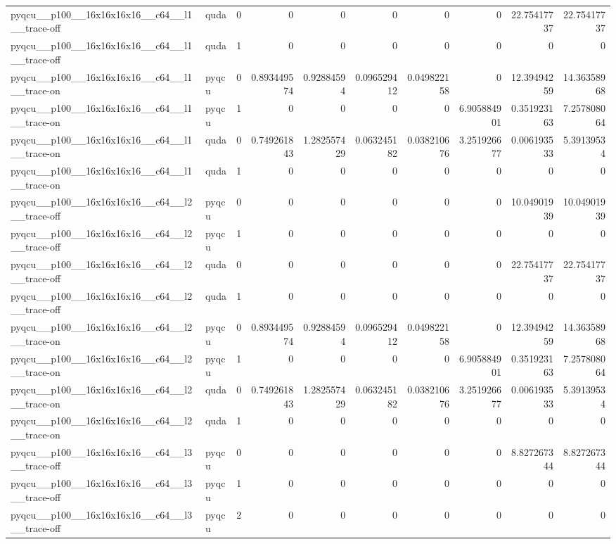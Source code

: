 \begin{table}[htbp]
\begin{tabular}{@{}llrrrrrrrr@{}}
pyqcu\_\_p100\_\_16x16x16x16\_\_c64\_\_l1\_\_trace-off & quda & 0 & 0 & 0 & 0 & 0 & 0 & 22.75417737 & 22.75417737 \\
pyqcu\_\_p100\_\_16x16x16x16\_\_c64\_\_l1\_\_trace-off & quda & 1 & 0 & 0 & 0 & 0 & 0 & 0 & 0 \\
pyqcu\_\_p100\_\_16x16x16x16\_\_c64\_\_l1\_\_trace-on & pyqcu & 0 & 0.893449574 & 0.92884594 & 0.096529412 & 0.049822158 & 0 & 12.39494259 & 14.36358968 \\
pyqcu\_\_p100\_\_16x16x16x16\_\_c64\_\_l1\_\_trace-on & pyqcu & 1 & 0 & 0 & 0 & 0 & 6.905884901 & 0.351923163 & 7.257808064 \\
pyqcu\_\_p100\_\_16x16x16x16\_\_c64\_\_l1\_\_trace-on & quda & 0 & 0.749261843 & 1.282557429 & 0.063245182 & 0.038210676 & 3.251926677 & 0.006193533 & 5.39139534 \\
pyqcu\_\_p100\_\_16x16x16x16\_\_c64\_\_l1\_\_trace-on & quda & 1 & 0 & 0 & 0 & 0 & 0 & 0 & 0 \\
pyqcu\_\_p100\_\_16x16x16x16\_\_c64\_\_l2\_\_trace-off & pyqcu & 0 & 0 & 0 & 0 & 0 & 0 & 10.04901939 & 10.04901939 \\
pyqcu\_\_p100\_\_16x16x16x16\_\_c64\_\_l2\_\_trace-off & pyqcu & 1 & 0 & 0 & 0 & 0 & 0 & 0 & 0 \\
pyqcu\_\_p100\_\_16x16x16x16\_\_c64\_\_l2\_\_trace-off & quda & 0 & 0 & 0 & 0 & 0 & 0 & 22.75417737 & 22.75417737 \\
pyqcu\_\_p100\_\_16x16x16x16\_\_c64\_\_l2\_\_trace-off & quda & 1 & 0 & 0 & 0 & 0 & 0 & 0 & 0 \\
pyqcu\_\_p100\_\_16x16x16x16\_\_c64\_\_l2\_\_trace-on & pyqcu & 0 & 0.893449574 & 0.92884594 & 0.096529412 & 0.049822158 & 0 & 12.39494259 & 14.36358968 \\
pyqcu\_\_p100\_\_16x16x16x16\_\_c64\_\_l2\_\_trace-on & pyqcu & 1 & 0 & 0 & 0 & 0 & 6.905884901 & 0.351923163 & 7.257808064 \\
pyqcu\_\_p100\_\_16x16x16x16\_\_c64\_\_l2\_\_trace-on & quda & 0 & 0.749261843 & 1.282557429 & 0.063245182 & 0.038210676 & 3.251926677 & 0.006193533 & 5.39139534 \\
pyqcu\_\_p100\_\_16x16x16x16\_\_c64\_\_l2\_\_trace-on & quda & 1 & 0 & 0 & 0 & 0 & 0 & 0 & 0 \\
pyqcu\_\_p100\_\_16x16x16x16\_\_c64\_\_l3\_\_trace-off & pyqcu & 0 & 0 & 0 & 0 & 0 & 0 & 8.827267344 & 8.827267344 \\
pyqcu\_\_p100\_\_16x16x16x16\_\_c64\_\_l3\_\_trace-off & pyqcu & 1 & 0 & 0 & 0 & 0 & 0 & 0 & 0 \\
pyqcu\_\_p100\_\_16x16x16x16\_\_c64\_\_l3\_\_trace-off & pyqcu & 2 & 0 & 0 & 0 & 0 & 0 & 0 & 0 \\

\end{tabular}
\end{table}
